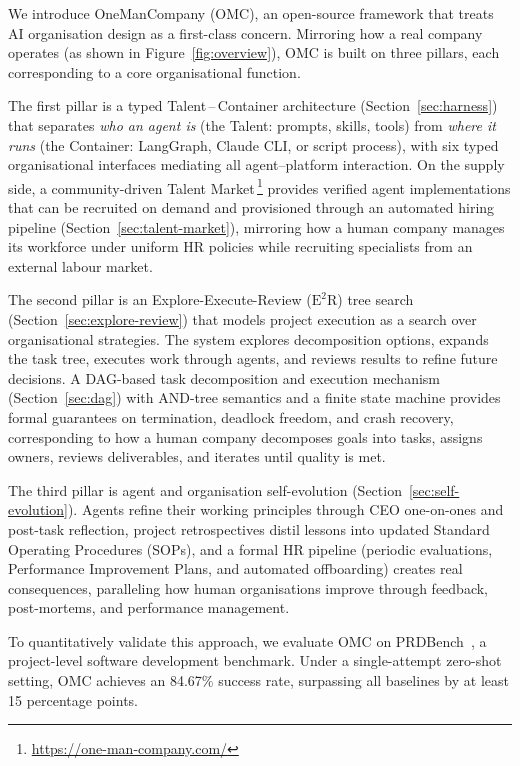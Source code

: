 \documentclass[11pt,a4paper]{article}
\begin{document}
We introduce OneManCompany (OMC), an open-source framework that treats AI organisation design as a first-class concern.  Mirroring how a real company operates  (as shown in Figure~\ref{fig:overview}), OMC is built on three pillars, each corresponding to a core organisational function.

The first pillar is a typed Talent\,--\,Container architecture (Section~\ref{sec:harness}) that separates \emph{who an agent is} (the Talent: prompts, skills, tools) from \emph{where it runs} (the Container: LangGraph, Claude CLI, or script process), with six typed organisational interfaces mediating all agent--platform interaction.  On the supply side, a community-driven Talent Market\,\footnote{\url{https://one-man-company.com/}} provides verified agent implementations that can be recruited on demand and provisioned through an automated hiring pipeline (Section~\ref{sec:talent-market}), mirroring how a human company manages its workforce under uniform HR policies while recruiting specialists from an external labour market.

The second pillar is an Explore-Execute-Review ($\text{E}^2$R) tree search (Section~\ref{sec:explore-review}) that models project execution as a search over organisational strategies.  The system explores decomposition options, expands the task tree, executes work through agents, and reviews results to refine future decisions.  A DAG-based task decomposition and execution mechanism (Section~\ref{sec:dag}) with AND-tree semantics and a finite state machine provides formal guarantees on termination, deadlock freedom, and crash recovery, corresponding to how a human company decomposes goals into tasks, assigns owners, reviews deliverables, and iterates until quality is met.

The third pillar is agent and organisation self-evolution (Section~\ref{sec:self-evolution}).  Agents refine their working principles through CEO one-on-ones and post-task reflection, project retrospectives distil lessons into updated Standard Operating Procedures (SOPs), and a formal HR pipeline (periodic evaluations, Performance Improvement Plans, and automated offboarding) creates real consequences, paralleling how human organisations improve through feedback, post-mortems, and performance management.

To quantitatively validate this approach, we evaluate OMC on PRDBench~\cite{fu2025prdbench}, a project-level software development benchmark.  Under a single-attempt zero-shot setting, OMC achieves an 84.67\% success rate, surpassing all baselines by at least 15 percentage points.
\end{document}
